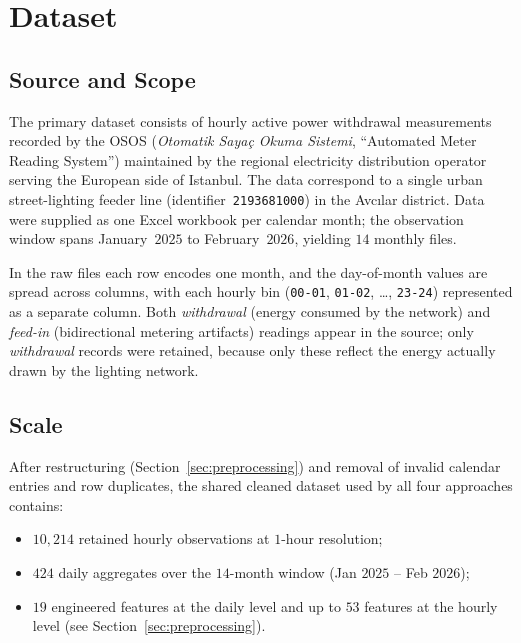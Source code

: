 \documentclass{article}
\begin{document}
\section{Dataset}\label{sec:dataset}

\subsection{Source and Scope}
The primary dataset consists of hourly active power withdrawal measurements recorded by the OSOS (\emph{Otomatik Say{a}{\c c} Okuma Sistemi}, ``Automated Meter Reading System'') maintained by the regional electricity distribution operator serving the European side of Istanbul. The data correspond to a single urban street-lighting feeder line (identifier~\texttt{2193681000}) in the Avc{\i}lar district. Data were supplied as one Excel workbook per calendar month; the observation window spans January~$2025$ to February~$2026$, yielding $14$ monthly files.

In the raw files each row encodes one month, and the day-of-month values are spread across columns, with each hourly bin (\texttt{00-01}, \texttt{01-02}, \ldots, \texttt{23-24}) represented as a separate column. Both \emph{withdrawal} (energy consumed by the network) and \emph{feed-in} (bidirectional metering artifacts) readings appear in the source; only \emph{withdrawal} records were retained, because only these reflect the energy actually drawn by the lighting network.

\subsection{Scale}
After restructuring (Section~\ref{sec:preprocessing}) and removal of invalid calendar entries and row duplicates, the shared cleaned dataset used by all four approaches contains:

\begin{itemize}[leftmargin=1.5em,itemsep=0pt]
  \item $10{,}214$ retained hourly observations at $1$-hour resolution;
  \item $424$ daily aggregates over the $14$-month window (Jan $2025$ -- Feb $2026$);
  \item $19$ engineered features at the daily level and up to $53$ features at the hourly level (see Section~\ref{sec:preprocessing}).
\end{itemize}
\end{document}
